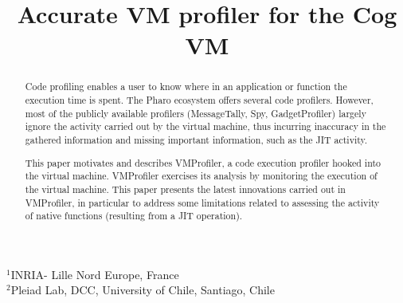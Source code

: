 \documentclass[10pt,preprint]{sigplanconf}
\newcommand{\Title}{Accurate VM profiler for the Cog VM}
\newcommand{\Authors}{Sophie Kaleba, Cl\'ement B\'era, Alexandre Bergel$^3$\\[2 ex]
$^3$Pleiad Lab, DCC, University of Chile}
\begin{document}
\setlength{\pdfpageheight}{\paperheight}
\setlength{\pdfpagewidth}{\paperwidth}



\title{\Title}


           {$^1$INRIA- Lille Nord Europe, France\\
             $^2$Pleiad Lab, DCC, University of Chile, Santiago, Chile}
           {}


\maketitle

\begin{abstract}

Code profiling enables a user to know where in an application or function the execution time is spent. The Pharo ecosystem offers several code profilers. However, most of the publicly available profilers (MessageTally, Spy, GadgetProfiler) largely ignore the activity carried out by the virtual machine, thus incurring inaccuracy in the gathered information and missing important information, such as the JIT activity.

This paper motivates and describes VMProfiler, a code execution profiler hooked into the virtual machine. VMProfiler exercises its analysis by monitoring the execution of the virtual machine. This paper presents the latest innovations carried out in VMProfiler, in particular to address some limitations related to assessing the activity of native functions (resulting from a JIT operation).

%
%

\end{abstract}
\end{document}
